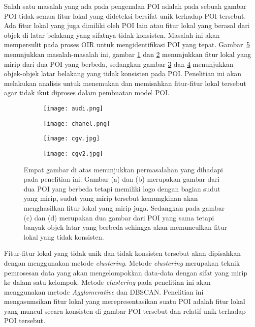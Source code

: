 Salah satu masalah yang ada pada pengenalan POI adalah pada sebuah gambar POI tidak semua fitur lokal yang dideteksi bersifat unik terhadap POI tersebut. Ada fitur lokal yang juga dimiliki oleh POI lain atau fitur lokal yang berasal dari objek di latar belakang yang sifatnya tidak konsisten. Masalah ini akan mempersulit pada proses OIR untuk mengidentifikasi POI yang tepat. Gambar~\ref{fig:keypoint_non_unique} menunjukkan masalah-masalah ini, gambar \ref{subfig:audi} dan \ref{subfig:chanel} menunjukkan fitur lokal yang mirip dari dua POI yang berbeda, sedangkan gambar \ref{subfig:cgv} dan \ref{subfig:cgv2} menunjukkan objek-objek latar belakang yang tidak konsisten pada POI. Penelitian ini akan melakukan analisis untuk menemukan dan memisahkan fitur-fitur lokal tersebut agar tidak ikut diproses dalam pembuatan model POI.

\begin{figure}[H]
	\begin{subfigure}[b]{.5\textwidth}
		\centering
		\texttt{[image: audi.png]}
		\caption{}
		\label{subfig:audi}
	\end{subfigure}%
	\begin{subfigure}[b]{.5\textwidth}
		\centering
		\texttt{[image: chanel.png]}
		\caption{}
		\label{subfig:chanel}
	\end{subfigure}
	\begin{subfigure}[b]{.5\textwidth}
		\centering
		\texttt{[image: cgv.jpg]}
		\caption{}
		\label{subfig:cgv}
	\end{subfigure}%
	\begin{subfigure}[b]{.5\textwidth}
		\centering
		\texttt{[image: cgv2.jpg]}
		\caption{}
		\label{subfig:cgv2}
	\end{subfigure}
	\caption{Empat gambar di atas menunjukkan permasalahan yang dihadapi pada penelitian ini. Gambar (a) dan (b) merupakan gambar dari dua POI yang berbeda tetapi memiliki logo dengan bagian sudut yang mirip, sudut yang mirip tersebut kemungkinan akan menghasilkan fitur lokal yang mirip juga. Sedangkan pada gambar (c) dan (d) merupakan dua gambar dari POI yang sama tetapi banyak objek latar yang berbeda sehingga akan memunculkan fitur lokal yang tidak konsisten.}
	\label{fig:keypoint_non_unique}
\end{figure}
Fitur-fitur lokal yang tidak unik dan tidak konsisten tersebut akan dipisahkan dengan menggunakan metode \textit{clustering}. Metode \textit{clustering} merupakan teknik pemrosesan data yang akan mengelompokkan data-data dengan sifat yang mirip ke dalam satu kelompok. Metode \textit{clustering} pada penelitian ini akan menggunakan metode \textit{Agglomerative} dan DBSCAN. Penelitian ini mengasumsikan fitur lokal yang merepresentasikan suatu POI adalah fitur lokal yang muncul secara konsisten di gambar POI tersebut dan relatif unik terhadap POI tersebut.

